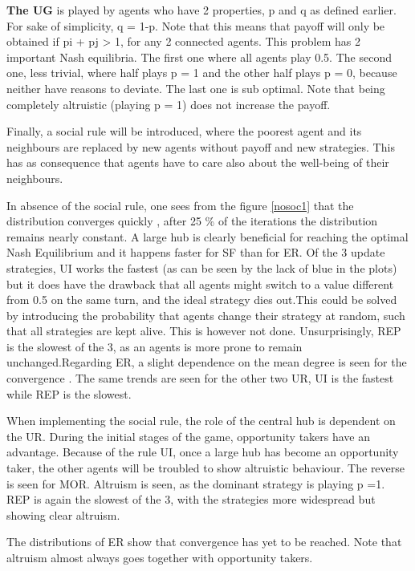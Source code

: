 \textbf{The UG} is played by agents who have 2 properties, p and q as defined earlier. For sake of simplicity, q = 1-p. Note that this means that payoff will only be obtained if pi + pj > 1, for any 2 connected agents.  This problem has 2 important Nash equilibria. The first one where all agents play 0.5. The second one, less trivial, where half plays p = 1 and the other half plays p = 0, because neither have reasons to deviate. The last one is sub optimal.
Note that being completely altruistic (playing  p = 1) does not increase the payoff.

Finally, a social rule will be introduced, where the poorest agent and its neighbours are replaced by new agents without payoff and new strategies. This has as consequence that agents have to care also about the well-being of their neighbours. 

In absence of the social rule, one sees from the figure \ref{nosoc1} that the distribution converges quickly , after 25 \% of the iterations the distribution remains nearly constant. A large hub is clearly beneficial for reaching the optimal Nash Equilibrium and it happens faster for SF than for ER. Of the 3 update strategies, UI works the fastest (as can be seen by the lack of blue in the plots) but it does have the drawback that all agents might switch to a value different from 0.5 on the same turn, and the ideal strategy dies out.This could be solved by introducing the probability that agents change their strategy at random, such that all strategies are kept alive. This is however not done.  
Unsurprisingly, REP is the slowest of the 3, as an agents is more prone to remain unchanged.Regarding ER, a slight dependence on the mean degree is seen for the convergence .  The same trends are seen for the other two UR, UI is the fastest while REP is the slowest.

When implementing the social rule, the role of the central hub is dependent  on the UR. During the initial stages of the game, opportunity takers have an advantage. Because of the rule UI, once a large hub has become an opportunity taker, the other agents will be troubled to show altruistic behaviour. The reverse is seen for MOR. Altruism is seen, as the dominant strategy is playing p =1. REP is again the slowest of the 3, with the strategies more widespread but showing clear altruism.

The distributions of ER show that convergence has yet to be reached. Note that altruism almost always goes together with opportunity takers.


